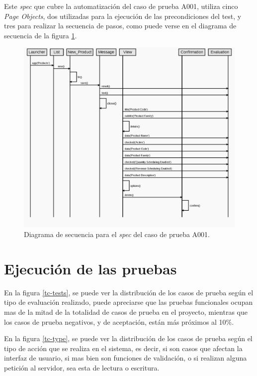 Este \emph{spec} que cubre la automatización del caso de prueba A001, utiliza
cinco \emph{Page Objects}, dos utilizadas para la ejecución de las
precondiciones del test, y tres para realizar la secuencia de pasos, como puede
verse en el diagrama de secuencia de la figura \ref{sequence}.

\begin{figure}
\centering
\includegraphics[width=1.0\textwidth]{graphics/diagram02.eps}
\caption{Diagrama de secuencia para el \emph{spec} del caso de prueba A001.}
\label{sequence}
\end{figure}

\section{Ejecución de las pruebas}
En la figura \ref{tc-tests}, se puede ver la distribución de los casos de prueba
según el tipo de evaluación realizado, puede apreciarse que las pruebas
funcionales ocupan mas de la mitad de la totalidad de casos de prueba en el
proyecto, mientras que los casos de prueba negativos, y de aceptación, están más
próximos al 10\%.

En la figura \ref{tc-type}, se puede ver la distribución de los casos de prueba
según el tipo de acción que se realiza en el sistema, es decir, si son casos
que afectan la interfaz de usuario, si mas bien son funciones de validación, o
si realizan alguna petición al servidor, sea esta de lectura o escritura.


